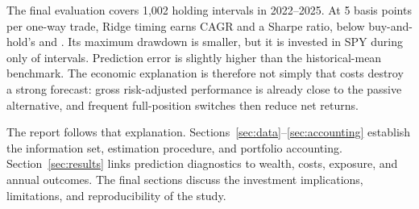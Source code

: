 The final evaluation covers 1,002 holding intervals in 2022--2025. At 5 basis points per one-way trade, Ridge timing earns \RidgeCAGR{} CAGR and a \RidgeSharpe{} Sharpe ratio, below buy-and-hold's \BHCAGR{} and \BHSharpe{}. Its maximum drawdown is smaller, but it is invested in SPY during only \RidgeExposure{} of intervals. Prediction error is slightly higher than the historical-mean benchmark. The economic explanation is therefore not simply that costs destroy a strong forecast: gross risk-adjusted performance is already close to the passive alternative, and frequent full-position switches then reduce net returns.

The report follows that explanation. Sections~\ref{sec:data}--\ref{sec:accounting} establish the information set, estimation procedure, and portfolio accounting. Section~\ref{sec:results} links prediction diagnostics to wealth, costs, exposure, and annual outcomes. The final sections discuss the investment implications, limitations, and reproducibility of the study.
